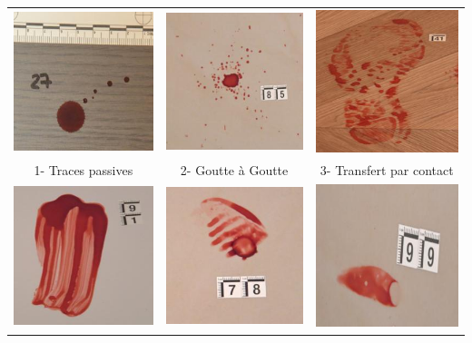 \documentclass[a4paper]{article}
\begin{document}
\begin{appendices}
\begin{table}[H]
    \centering
    \begin{tabular}{ccc}
        \includegraphics[width=0.20\linewidth]{../asset/data_labo/1_bois_350.jpg} & \includegraphics[width=0.20\linewidth]{../asset/data_labo/2_carrelage_523.jpg}& \includegraphics[width=0.20\linewidth]{../asset/data_labo/3_lino_888.jpg} \\
        1- Traces passives & 2- Goutte à Goutte & 3- Transfert par contact \\
        \includegraphics[width=0.20\linewidth]{../asset/data_labo/4_papier_1586.jpg} & \includegraphics[width=0.20\linewidth]{../asset/data_labo/5_carrelage_5605.jpg} & \includegraphics[width=0.20\linewidth]{../asset/data_labo/6_bois_604.jpg} \\

\end{tabular}
\end{table}
\end{appendices}
\end{document}
